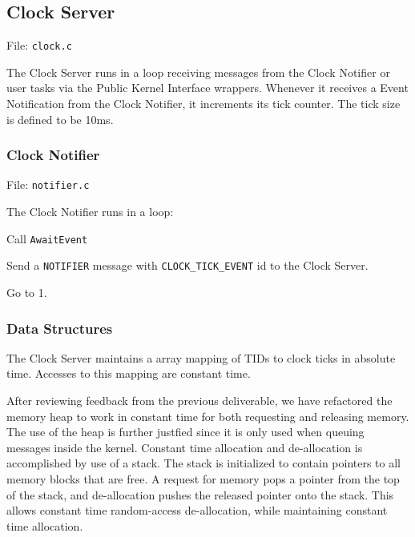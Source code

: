 \documentclass[letterpaper]{article}
\begin{document}
\subsection{Clock Server%
  \label{clock-server}%
}

File: \texttt{clock.c}

The Clock Server runs in a loop receiving messages from the Clock Notifier or user tasks via the Public Kernel Interface wrappers. Whenever it receives a Event Notification from the Clock Notifier, it increments its tick counter. The tick size is defined to be 10ms.


\subsubsection{Clock Notifier%
  \label{clock-notifier}%
}

File: \texttt{notifier.c}

The Clock Notifier runs in a loop:
\setcounter{listcnt0}{0}
\begin{list}{.}
{
\setlength{\rightmargin}{\leftmargin}
}

\item Call \texttt{AwaitEvent}

\item Send a \texttt{NOTIFIER} message with \texttt{CLOCK\_TICK\_EVENT} id to the Clock Server.

\item Go to 1.
\end{list}


\subsubsection{Data Structures%
  \label{data-structures}%
}

The Clock Server maintains a array mapping of TIDs to clock ticks in absolute time. Accesses to this mapping are constant time.

After reviewing feedback from the previous deliverable, we have refactored the memory heap to work in constant time for both requesting and releasing memory.  The use of the heap is further justfied since it is only used when queuing messages inside the kernel.  Constant time allocation and de-allocation is accomplished by use of a stack.  The stack is initialized to contain pointers to all memory blocks that are free.  A request for memory pops a pointer from the top of the stack, and de-allocation pushes the released pointer onto the stack.  This allows constant time random-access de-allocation, while maintaining constant time allocation.
\end{document}

